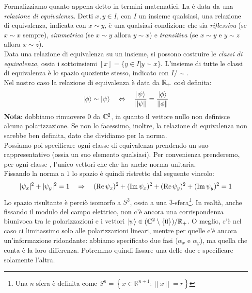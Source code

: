 \documentclass[FisicaTeorica.tex]{subfiles}
\begin{document}
Formalizziamo quanto appena detto in termini matematici.
 La  è data da una \textit{relazione di equivalenza}. Detti $x,y\in I$, con $I$ un insieme qualsiasi, una relazione di equivalenza, indicata con $x\sim y$, è una qualsiasi condizione che sia \textit{riflessiva} (se $x\sim x$ sempre), \textit{simmetrica} (se $x\sim y$ allora $y\sim x$) e \textit{transitiva} (se $x\sim y$ e $y\sim z$ allora $x\sim z$).\\
Data una relazione di equivalenza su un insieme, si possono costruire le \textit{classi di equivalenza}, ossia i sottoinsiemi $[x] = \{y \in I | y\sim x\}$. L'insieme di tutte le classi di equivalenza è lo spazio quoziente stesso, indicato con $I/\sim$.\\
Nel nostro caso la relazione di equivalenza è data da $\mathbb{R}_+$ così definita:
\[
\ket{\phi} \sim \ket{\psi} \quad \Leftrightarrow \quad \frac{\ket{\psi}}{\left\lVert\psi\right\rVert} = \frac{\ket{\phi}}{\left\lVert\phi\right\rVert}
\]
\textbf{Nota}: dobbiamo rimuovere $0$ da $\mathbb{C}^2$, in quanto il vettore nullo non definisce alcuna polarizzazione. Se non lo facessimo, inoltre, la relazione di equivalenza non sarebbe ben definita, dato che dividiamo per la norma.\\
Possiamo poi specificare ogni classe di equivalenza prendendo un suo rappresentativo (ossia un suo elemento qualsiasi). Per convenienza prenderemo, per ogni classe , l'unico vettori che  che ha anche norma unitaria.\\
Fissando la norma a $1$ lo spazio è quindi ristretto dal seguente vincolo:
\[
|\psi_x|^2 + |\psi_y|^2 = 1 \quad \Rightarrow \quad (\operatorname{Re}\psi_x)^2 + (\operatorname{Im}\psi_x)^2 + (\operatorname{Re}\psi_y)^2 + (\operatorname{Im}\psi_y)^2 = 1
\]
Lo spazio risultante è perciò isomorfo a $S^3$, ossia a una $3$-sfera\footnote{Una $n$-sfera è definita come $S^{n}=\left\{x\in \mathbb {R} ^{n+1}:\left\|x\right\|=r\right\}$}.
In realtà, anche fissando il modulo del campo elettrico, non c'è ancora una corrispondenza biunivoca tra le polarizzazioni  e i vettori $\ket{\psi} \in (\mathbb{C}^2\setminus\{0\})/\mathbb{R}_+$. O meglio, c'è nel caso ci limitassimo solo alle polarizzazioni lineari, mentre per quelle  c'è ancora un'informazione ridondante: abbiamo specificato due fasi ($\alpha_x$ e $\alpha_y$), ma quella che conta è la loro differenza. Potremmo quindi fissare una delle due e specificare solamente l'altra.\\
\end{document}
